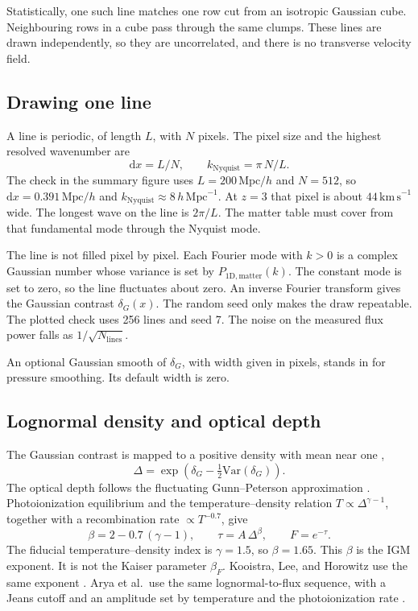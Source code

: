\documentclass[11pt]{article}
\begin{document}
Statistically, one such line matches one row cut from an isotropic Gaussian cube. Neighbouring rows in a cube pass through the same clumps. These lines are drawn independently, so they are uncorrelated, and there is no transverse velocity field.

\subsection{Drawing one line}

A line is periodic, of length $L$, with $N$ pixels. The pixel size and the highest resolved wavenumber are
\begin{equation}
\mathrm{d}x = L/N,
\qquad
k_\mathrm{Nyquist} = \pi\,N/L.
\end{equation}
The check in the summary figure uses $L=200\,\mathrm{Mpc}/h$ and $N=512$, so $\mathrm{d}x=0.391\,\mathrm{Mpc}/h$ and $k_\mathrm{Nyquist}\approx 8\,h\,\mathrm{Mpc}^{-1}$. At $z=3$ that pixel is about $44\,\mathrm{km\,s}^{-1}$ wide. The longest wave on the line is $2\pi/L$. The matter table must cover from that fundamental mode through the Nyquist mode.

The line is not filled pixel by pixel. Each Fourier mode with $k>0$ is a complex Gaussian number whose variance is set by $P_{1\mathrm{D},\mathrm{matter}}(k)$. The constant mode is set to zero, so the line fluctuates about zero. An inverse Fourier transform gives the Gaussian contrast $\delta_G(x)$. The random seed only makes the draw repeatable. The plotted check uses 256 lines and seed 7. The noise on the measured flux power falls as $1/\sqrt{N_\mathrm{lines}}$.

An optional Gaussian smooth of $\delta_G$, with width given in pixels, stands in for pressure smoothing. Its default width is zero.

\subsection{Lognormal density and optical depth}
\label{sec:fgpa}

The Gaussian contrast is mapped to a positive density with mean near one \cite{Bi:1996fh,Coles:1991if},
\begin{equation}
\label{eq:lognormal}
\Delta = \exp\!\left(\delta_G - \tfrac{1}{2}\mathrm{Var}(\delta_G)\right).
\end{equation}
The optical depth follows the fluctuating Gunn--Peterson approximation \cite{Gunn:1965hd,Bi:1996fh,Hui:1997dp}. Photoionization equilibrium and the temperature--density relation $T\propto\Delta^{\gamma-1}$, together with a recombination rate $\propto T^{-0.7}$, give
\begin{equation}
\label{eq:beta}
\beta = 2 - 0.7\,(\gamma - 1),
\qquad
\tau = A\,\Delta^{\beta},
\qquad
F = e^{-\tau}.
\end{equation}
The fiducial temperature--density index is $\gamma=1.5$, so $\beta=1.65$. This $\beta$ is the IGM exponent. It is not the Kaiser parameter $\beta_F$. Kooistra, Lee, and Horowitz use the same exponent \cite{Kooistra:2022hzw}. Arya et al.\ use the same lognormal-to-flux sequence, with a Jeans cutoff and an amplitude set by temperature and the photoionization rate \cite{Arya:2022uke}.
\end{document}
